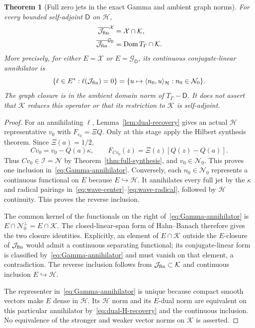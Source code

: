 \documentclass[11pt,a4paper]{article}
\numberwithin{equation}{section}
\newtheorem{theorem}{Theorem}[section]
\theoremstyle{definition}
\theoremstyle{remark}
\newcommand{\Hh}{\mathcal H}
\newcommand{\Nn}{\mathcal N}
\newcommand{\Ii}{\mathcal I}
\newcommand{\Kk}{\mathcal K}
\newcommand{\ip}[2]{\langle #1,#2\rangle}
\begin{document}
\begin{theorem}[Full zero jets in the exact Gamma and ambient graph norms]\label{thm:Gamma-jet-core}
For every bounded self-adjoint $\mathsf D$ on $\Hh$,
\begin{align}
 \overline{\mathcal J_{\rm fin}}^{\mathcal X}
   &=\mathcal X\cap\Kk,\label{eq:Gamma-form-jet-core}\\
 \overline{\mathcal J_{\rm fin}}^{\mathcal G_{\mathsf D}}
   &=\operatorname{Dom}T_\Gamma\cap\Kk.
 \label{eq:Gamma-graph-jet-core}
\end{align}
More precisely, for either $E=\mathcal X$ or $E=\mathcal G_{\mathsf D}$, its continuous conjugate-linear annihilator is
\begin{equation}\label{eq:Gamma-annihilator}
 \{\ell\in E^*: \ell(\mathcal J_{\rm fin})=0\}
 =\{u\mapsto\ip{n_0}{u}_{\Hh}:n_0\in\Nn_0\}.
\end{equation}
The graph closure is in the ambient domain norm of $T_\Gamma-\mathsf D$. It does not assert that $\Kk$ reduces this operator or that its restriction to $\Kk$ is self-adjoint.
\end{theorem}
\begin{proof}
For an annihilating $\ell$, Lemma~\ref{lem:dual-recovery} gives an actual $\Hh$ representative $v_0$ with $F_{v_0}=\Xi Q$. Only at this stage apply the Hilbert synthesis theorem. Since $\Xi(a)=1/2$,
\[
 Cv_0=v_0-Q(a)\kappa,\qquad
 F_{Cv_0}(z)=\Xi(z)[Q(z)-Q(a)].
\]
Thus $Cv_0\in\Ii=\Nn$ by Theorem~\ref{thm:full-synthesis}, and $v_0\in\Nn_0$. This proves one inclusion in~\eqref{eq:Gamma-annihilator}. Conversely, each $n_0\in\Nn_0$ represents a continuous functional on $E$ because $E\hookrightarrow\Hh$. It annihilates every full jet by the $\kappa$ and radical pairings in~\eqref{eq:wave-center}--\eqref{eq:wave-radical}, followed by $\Hh$ continuity. This proves the reverse inclusion.

The common kernel of the functionals on the right of~\eqref{eq:Gamma-annihilator} is $E\cap\Nn_0^\perp=E\cap\Kk$. The closed-linear-span form of Hahn--Banach therefore gives the two closure identities. Explicitly, an element of $E\cap\Kk$ outside the $E$-closure of $\mathcal J_{\rm fin}$ would admit a continuous separating functional; its conjugate-linear form is classified by~\eqref{eq:Gamma-annihilator} and must vanish on that element, a contradiction. The reverse inclusion follows from $\mathcal J_{\rm fin}\subset\Kk$ and continuous inclusion $E\hookrightarrow\Hh$.

The representer in~\eqref{eq:Gamma-annihilator} is unique because compact smooth vectors make $E$ dense in $\Hh$. Its $\Hh$ norm and its $E$-dual norm are equivalent on this particular annihilator by~\eqref{eq:dual-H-recovery} and the continuous inclusion. No equivalence of the stronger and weaker vector norms on $\Kk$ is asserted.
\end{proof}
\end{document}
